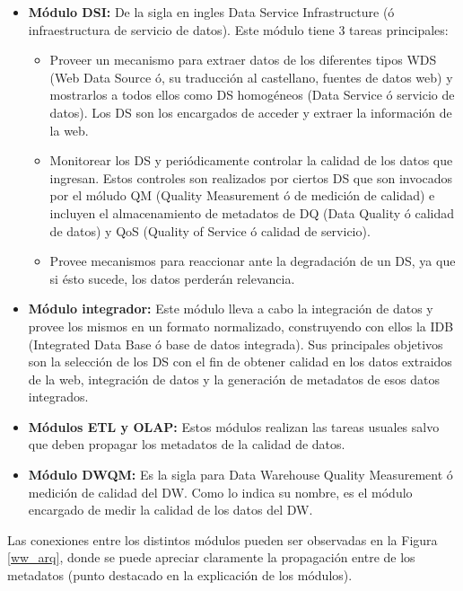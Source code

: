 \documentclass[a4paper,11pt]{article}
\begin{document}
\begin{flushleft}
    \begin{itemize}
      \item \textbf{Módulo DSI:} De la sigla en ingles Data Service Infrastructure (ó infraestructura de servicio de datos). Este módulo tiene 3 tareas
      principales:
        \begin{itemize}
          \item Proveer un mecanismo para extraer datos de los diferentes tipos WDS (Web Data Source ó, su traducción al castellano, fuentes de datos web) y
          mostrarlos a todos ellos como DS homogéneos (Data Service ó servicio de datos). Los DS son los encargados de acceder y extraer la información de la web.
          \item Monitorear los DS y periódicamente controlar la calidad de los datos que ingresan. Estos controles son realizados por ciertos DS que son
          invocados por el móludo QM (Quality Measurement ó de medición de calidad) e incluyen el almacenamiento de metadatos de DQ (Data Quality ó calidad de
          datos) y QoS (Quality of Service ó calidad de servicio).
          \item Provee mecanismos para reaccionar ante la degradación de un DS, ya que si ésto sucede, los datos perderán relevancia.
        \end{itemize}
      \item \textbf{Módulo integrador:} Este módulo lleva a cabo la integración de datos y provee los mismos en un formato normalizado, construyendo con ellos la
      IDB (Integrated Data Base ó base de datos integrada). Sus principales objetivos son la selección de los DS con el fin de obtener calidad en los datos
      extraidos de la web, integración de datos y la generación de metadatos de esos datos integrados.
      \item \textbf{Módulos ETL y OLAP:} Estos módulos realizan las tareas usuales salvo que deben propagar los metadatos de la calidad de datos.
      \item \textbf{Módulo DWQM:} Es la sigla para Data Warehouse Quality Measurement ó medición de calidad del DW. Como lo indica su nombre, es el módulo
      encargado de medir la calidad de los datos del DW.
    \end{itemize}
    
    Las conexiones entre los distintos módulos pueden ser observadas en la Figura \ref{ww_arq}, donde se puede apreciar claramente la propagación entre de los
    metadatos (punto destacado en la explicación de los módulos).
    

\end{flushleft}
\end{document}
